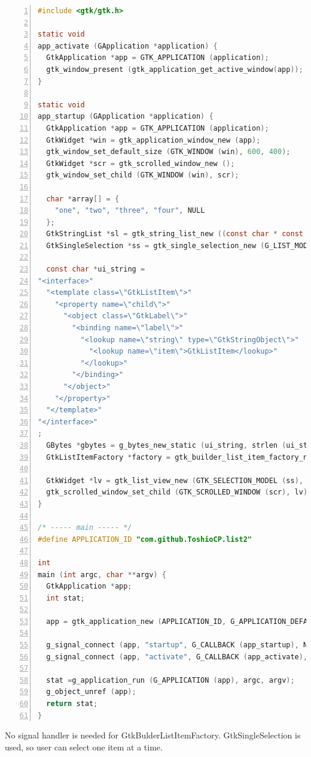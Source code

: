 \begin{lstlisting}[language=C, numbers=left]
#include <gtk/gtk.h>

static void
app_activate (GApplication *application) {
  GtkApplication *app = GTK_APPLICATION (application);
  gtk_window_present (gtk_application_get_active_window(app));
}

static void
app_startup (GApplication *application) {
  GtkApplication *app = GTK_APPLICATION (application);
  GtkWidget *win = gtk_application_window_new (app);
  gtk_window_set_default_size (GTK_WINDOW (win), 600, 400);
  GtkWidget *scr = gtk_scrolled_window_new ();
  gtk_window_set_child (GTK_WINDOW (win), scr);

  char *array[] = {
    "one", "two", "three", "four", NULL
  };
  GtkStringList *sl = gtk_string_list_new ((const char * const *) array);
  GtkSingleSelection *ss = gtk_single_selection_new (G_LIST_MODEL (sl));

  const char *ui_string =
"<interface>"
  "<template class=\"GtkListItem\">"
    "<property name=\"child\">"
      "<object class=\"GtkLabel\">"
        "<binding name=\"label\">"
          "<lookup name=\"string\" type=\"GtkStringObject\">"
            "<lookup name=\"item\">GtkListItem</lookup>"
          "</lookup>"
        "</binding>"
      "</object>"
    "</property>"
  "</template>"
"</interface>"
;
  GBytes *gbytes = g_bytes_new_static (ui_string, strlen (ui_string));
  GtkListItemFactory *factory = gtk_builder_list_item_factory_new_from_bytes (NULL, gbytes);

  GtkWidget *lv = gtk_list_view_new (GTK_SELECTION_MODEL (ss), factory);
  gtk_scrolled_window_set_child (GTK_SCROLLED_WINDOW (scr), lv);
}

/* ----- main ----- */
#define APPLICATION_ID "com.github.ToshioCP.list2"

int
main (int argc, char **argv) {
  GtkApplication *app;
  int stat;

  app = gtk_application_new (APPLICATION_ID, G_APPLICATION_DEFAULT_FLAGS);

  g_signal_connect (app, "startup", G_CALLBACK (app_startup), NULL);
  g_signal_connect (app, "activate", G_CALLBACK (app_activate), NULL);

  stat =g_application_run (G_APPLICATION (app), argc, argv);
  g_object_unref (app);
  return stat;
}
\end{lstlisting}

No signal handler is needed for GtkBulderListItemFactory.
GtkSingleSelection is used, so user can select one item at a time.

